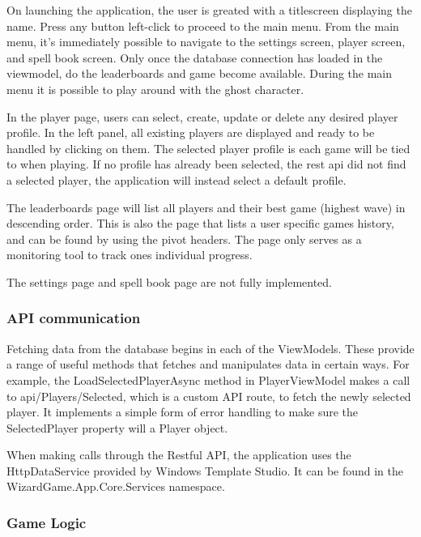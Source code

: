 \documentclass[12pt]{article}
\begin{document}
        On launching the application, the user is greated with a titlescreen displaying the name. Press any button left-click to proceed to the main menu. From the main menu, it's immediately possible to navigate to the settings screen, player screen, and spell book screen. Only once the database connection has loaded in the viewmodel, do the leaderboards and game become available. During the main menu it is possible to play around with the ghost character.

        In the player page, users can select, create, update or delete any desired player profile. In the left panel, all existing players are displayed and ready to be handled by clicking on them. The selected player profile is each game will be tied to when playing. If no profile has already been selected, the rest api did not find a selected player, the application will instead select a default profile.

        The leaderboards page will list all players and their best game (highest wave) in descending order. This is also the page that lists a user specific games history, and can be found by using the pivot headers. The page only serves as a monitoring tool to track ones individual progress.
        
        The settings page and spell book page are not fully implemented.

        \subsubsection{API communication}

        Fetching data from the database begins in each of the ViewModels. These provide a range of useful methods that fetches and manipulates data in certain ways. For example, the LoadSelectedPlayerAsync method in PlayerViewModel makes a call to api/Players/Selected, which is a custom API route, to fetch the newly selected player. It implements a simple form of error handling to make sure the SelectedPlayer property will a Player object.

        When making calls through the Restful API, the application uses the HttpDataService provided by Windows Template Studio. It can be found in the WizardGame.App.Core.Services namespace.

        \subsubsection{Game Logic}
\end{document}
